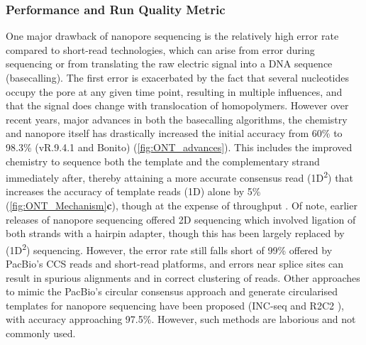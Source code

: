 \vspace{1cm}
\subsubsection{Performance and Run Quality Metric}
One major drawback of nanopore sequencing is the relatively high error rate compared to short-read technologies, which can arise from error during sequencing or from translating the raw electric signal into a DNA sequence (basecalling)\cite{Rang2018}. The first error is exacerbated by the fact that several nucleotides occupy the pore at any given time point, resulting in multiple influences, and that the signal does change with translocation of homopolymers. However over recent years, major advances in both the basecalling algorithms, the chemistry and nanopore itself has drastically increased the initial accuracy from 60\% \cite{Jain2015} to 98.3\% (vR.9.4.1 and Bonito) (\cref{fig:ONT_advances}). This includes the improved chemistry to sequence both the template and the complementary strand immediately after, thereby attaining a more accurate consensus read (1D\textsuperscript{2}) that increases the accuracy of template reads (1D) alone by 5\%\cite{Rang2018} (\cref{fig:ONT_Mechanism}\textbf{c}), though at the expense of throughput \cite{NanoporeCommunityPosts}. Of note, earlier releases of nanopore sequencing offered 2D sequencing which involved ligation of both strands with a hairpin adapter, though this has been largely replaced by (1D\textsuperscript{2}) sequencing. However, the error rate still falls short of 99\% offered by PacBio's CCS reads and short-read platforms, and errors near splice sites can result in spurious alignments and in correct clustering of reads. Other approaches to mimic the PacBio's circular consensus approach and generate circularised templates for nanopore sequencing have been proposed (INC-seq \cite{Li2016c} and R2C2 \cite{Volden2018}), with accuracy approaching 97.5\%. However, such methods are laborious and not commonly used.  

